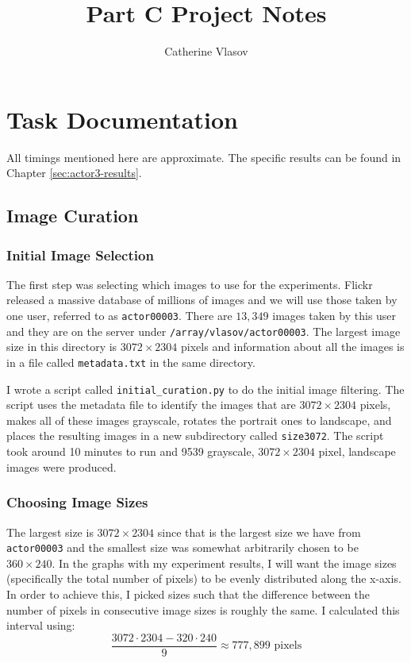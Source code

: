 \documentclass[11pt,a4paper]{report}
\begin{document}
\title{Part C Project Notes}
\author{Catherine Vlasov}
\maketitle

\tableofcontents


\chapter{Task Documentation}

All timings mentioned here are approximate. The specific results can be found in Chapter \ref{sec:actor3-results}.

\section{Image Curation}

\subsection{Initial Image Selection}
\label{subsec:initial-image-selection}

The first step was selecting which images to use for the experiments. Flickr released a massive database of millions of images and we will use those taken by one user, referred to as \texttt{actor00003}. There are $13,349$ images taken by this user and they are on the server under \texttt{/array/vlasov/actor00003}. The largest image size in this directory is $3072\times2304$ pixels and information about all the images is in a file called \texttt{metadata.txt} in the same directory.

I wrote a script called \texttt{initial\_curation.py} to do the initial image filtering. The script uses the metadata file to identify the images that are $3072\times2304$ pixels, makes all of these images grayscale, rotates the portrait ones to landscape, and places the resulting images in a new subdirectory called \texttt{size3072}. The script took around 10 minutes to run and 9539 grayscale, $3072\times2304$ pixel, landscape images were produced.


\subsection{Choosing Image Sizes}
\label{subsec:image-sizes}

The largest size is $3072\times2304$ since that is the largest size we have from \texttt{actor00003} and the smallest size was somewhat arbitrarily chosen to be $360\times240$. In the graphs with my experiment results, I will want the image sizes (specifically the total number of pixels) to be evenly distributed along the x-axis. In order to achieve this, I picked sizes such that the difference between the number of pixels in consecutive image sizes is roughly the same. I calculated this interval using:
\begin{equation*}
\frac{3072 \cdot 2304 - 320 \cdot 240}{9} \approx 777,899 \text{ pixels}
\end{equation*}
\end{document}
